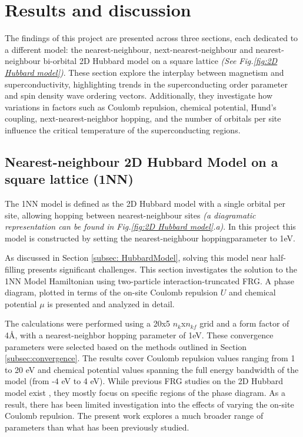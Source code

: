 \documentclass[12pt]{article}
\begin{document}
\section{Results and discussion}

The findings of this project are presented across three sections, each dedicated to 
a different model: the nearest-neighbour, next-nearest-neighbour and nearest-neighbour
bi-orbital 2D Hubbard model on a square lattice \textit{(See Fig.\ref{fig:2D Hubbard model})}. 
These section explore the interplay between magnetism and superconductivity, 
highlighting trends in the superconducting order parameter and spin density wave
ordering vectors. Additionally, they investigate how variations in factors such as 
Coulomb repulsion, chemical potential, Hund's coupling, next-nearest-neighbor hopping, and the number of orbitals per site 
influence the critical temperature of the superconducting regions.

\subsection{Nearest-neighbour 2D Hubbard Model on a square lattice (1NN)}
\label{subsec:1NNModel}

The 1NN model is defined as the 2D Hubbard model with a single orbital per site,  allowing hopping between nearest-neighbour sites \textit{(a diagramatic representation can be found in Fig.\ref{fig:2D Hubbard model}.a)}. 
In this project this model is constructed by setting the nearest-neighbour hoppingparameter to 1eV.

As discussed in Section \ref{subsec: HubbardModel}, solving this model near half-filling presents significant challenges. This section investigates the solution to the 1NN Model Hamiltonian using two-particle interaction-truncated FRG. A phase diagram, plotted in terms of the on-site Coulomb repulsion 
$U$ and chemical potential $\mu$ is presented and analyzed in detail.


The calculations were performed using a 20x5 $n_k$x$n_{kf}$
grid and a form factor of 4\AA, with a nearest-neighbor hopping parameter of 1eV.
These convergence parameters were selected based on the methods outlined in Section \ref{subsec:convergence}. 
The results cover Coulomb repulsion values ranging from 1 to 20 eV and chemical potential values spanning the full energy bandwidth 
of the model (from -4 eV to 4 eV). While previous FRG studies on the 2D Hubbard model exist \cite{beyer2023rashba,hille2020quantitative,vilardi2020dynamical},
they mostly focus on specific regions of the phase diagram. As a result, there has been limited investigation into the effects of varying the on-site Coulomb repulsion.
The present work explores a much broader range of parameters than what has been previously studied.\par
\medskip
\end{document}
